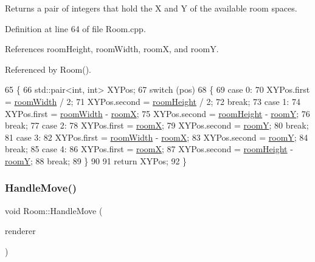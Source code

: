 Returns a pair of integers that hold the X and Y of the available room spaces. 

Definition at line 64 of file Room.\+cpp.



References room\+Height, room\+Width, roomX, and roomY.



Referenced by Room().


\begin{DoxyCode}
65 \{
66     std::pair<int, int> XYPos;
67     \textcolor{keywordflow}{switch} (pos)
68     \{
69     \textcolor{keywordflow}{case} 0:
70         XYPos.first = \hyperlink{class_room_a3538dc1a9a08a492cec337399db77259}{roomWidth} / 2;
71         XYPos.second = \hyperlink{class_room_a3f6fbe94c4c124e4c4df85e57fbb703b}{roomHeight} / 2;
72         \textcolor{keywordflow}{break};
73     \textcolor{keywordflow}{case} 1:
74         XYPos.first = \hyperlink{class_room_a3538dc1a9a08a492cec337399db77259}{roomWidth} - \hyperlink{class_room_a5cb7d8efa1ea04af080f7e2c041fea1a}{roomX};
75         XYPos.second = \hyperlink{class_room_a3f6fbe94c4c124e4c4df85e57fbb703b}{roomHeight} - \hyperlink{class_room_a702c5d200cedc6e9eef5cbc2034fdc17}{roomY};
76         \textcolor{keywordflow}{break};
77     \textcolor{keywordflow}{case} 2:
78         XYPos.first = \hyperlink{class_room_a5cb7d8efa1ea04af080f7e2c041fea1a}{roomX};
79         XYPos.second = \hyperlink{class_room_a702c5d200cedc6e9eef5cbc2034fdc17}{roomY};
80         \textcolor{keywordflow}{break};
81     \textcolor{keywordflow}{case} 3:
82         XYPos.first = \hyperlink{class_room_a3538dc1a9a08a492cec337399db77259}{roomWidth} - \hyperlink{class_room_a5cb7d8efa1ea04af080f7e2c041fea1a}{roomX};
83         XYPos.second = \hyperlink{class_room_a702c5d200cedc6e9eef5cbc2034fdc17}{roomY};
84         \textcolor{keywordflow}{break};
85     \textcolor{keywordflow}{case} 4:
86         XYPos.first = \hyperlink{class_room_a5cb7d8efa1ea04af080f7e2c041fea1a}{roomX};
87         XYPos.second = \hyperlink{class_room_a3f6fbe94c4c124e4c4df85e57fbb703b}{roomHeight} - \hyperlink{class_room_a702c5d200cedc6e9eef5cbc2034fdc17}{roomY};
88         \textcolor{keywordflow}{break};
89     \}
90 
91     \textcolor{keywordflow}{return} XYPos;
92 \}
\end{DoxyCode}
\mbox{\label{class_room_ae40e34ac3588b2dfe2be6c5d66e20552}} 
\subsubsection{\texorpdfstring{Handle\+Move()}{HandleMove()}}
{\footnotesize\ttfamily void Room\+::\+Handle\+Move (\begin{DoxyParamCaption}\item[{S\+D\+L\+\_\+\+Renderer $\ast$}]{renderer }\end{DoxyParamCaption})}



